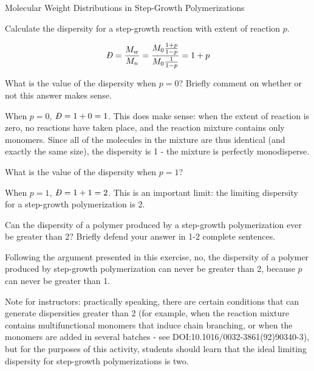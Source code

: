 \begin{activity}{Molecular Weight Distributions in Step-Growth Polymerizations}
\begin{model}
\end{model}

\begin{ctqs}
		\question Calculate the dispersity for a step-growth reaction with extent of reaction $p$.
		
			\begin{solution}[1.25in]
			
				\begin{equation*}
					\PDImath = \frac{M_w}{M_n} = \frac{M_0\frac{1+p}{1-p}}{M_0\frac{1}{1-p}} = 1+p
				\end{equation*}
			\end{solution}
			
			
		\question What is the value of the dispersity when $p=0$?  Briefly comment on whether or not this answer makes sense.
		
			\begin{solution}[1.5in]
			
				When $p=0$, $\PDImath=1+0 = 1$.  This does make sense: when the extent of reaction is zero, no reactions have taken place, and the reaction mixture contains only monomers.  Since all of the molecules in the mixture are thus identical (and exactly the same size), the dispersity is 1 - the mixture is perfectly monodisperse.
			
			\end{solution}
			
			
		\question What is the value of the dispersity when $p=1$?
		
			\begin{solution}[1in]
			
				When $p=1$, $\PDImath=1+1=2$.  This is an important limit: the limiting dispersity for a step-growth polymerization is 2.
			
			\end{solution}
			
			
			
		\question Can the dispersity of a polymer produced by a step-growth polymerization ever be greater than 2?  Briefly defend your answer in 1-2 complete sentences.
		
			\begin{solution}[1.5in]
			
				Following the argument presented in this exercise, no, the dispersity of a polymer produced by step-growth polymerization can never be greater than 2, because $p$ can never be greater than 1. 
				
				Note for instructors: practically speaking, there are certain conditions that can generate dispersities greater than 2 (for example, when the reaction mixture contains multifunctional monomers that induce chain branching, or when the monomers are added in several batches - see DOI:10.1016/0032-3861(92)90340-3), but for the purposes of this activity, students should learn that the ideal limiting dispersity for step-growth polymerizations is two.
			

\end{solution}
\end{ctqs}
\end{activity}
